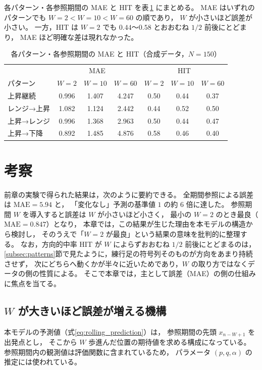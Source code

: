 \documentclass[a4j,dvipdfmx]{jsarticle}
\theoremstyle{plainnote}
\begin{document}
各パターン・各参照期間の MAE と HIT を表\,\ref{tab:pattern_summary} にまとめる。
MAE はいずれのパターンでも $W=2<W=10<W=60$ の順であり，
$W$ が小さいほど誤差が小さい。
一方，HIT は $W=2$ でも $0.44$〜$0.58$ とおおむね $1/2$ 前後にとどまり，
MAE ほど明確な差は現れなかった。

\begin{table}[H]\centering
  \caption{各パターン・各参照期間の MAE と HIT（合成データ，$N=150$）}
  \label{tab:pattern_summary}
  \begin{tabular}{l|ccc|ccc}\hline
    & \multicolumn{3}{c|}{MAE} & \multicolumn{3}{c}{HIT} \\
    パターン & $W=2$ & $W=10$ & $W=60$ & $W=2$ & $W=10$ & $W=60$ \\\hline
    上昇継続     & 0.996 & 1.407 & 4.247 & 0.50 & 0.44 & 0.37 \\
    レンジ→上昇 & 1.082 & 1.124 & 2.442 & 0.44 & 0.52 & 0.50 \\
    上昇→レンジ & 0.996 & 1.368 & 2.963 & 0.50 & 0.44 & 0.47 \\
    上昇→下降   & 0.892 & 1.485 & 4.876 & 0.58 & 0.46 & 0.40 \\\hline
  \end{tabular}
\end{table}

\newpage

\section{考察}
前章の実験で得られた結果は，次のように要約できる。
全期間参照による誤差は $\mathrm{MAE}=5.94$ と，
「変化なし」予測の基準値 $1$ の約 $6$ 倍に達した。
参照期間 $W$ を導入すると誤差は $W$ が小さいほど小さく，
最小の $W=2$ のとき最良（$\mathrm{MAE}=0.847$）となり，
本章では，この結果が生じた理由を本モデルの構造から検討し，
そのうえで「$W=2$ が最良」という結果の意味を批判的に整理する。
なお，方向的中率 HIT が $W$ によらずおおむね $1/2$ 前後にとどまるのは，
\ref{subsec:patterns}節で見たように，練行足の符号列そのものが方向をあまり持続させず，
次にどちらへ動くかが半々に近いためであり，$W$ の取り方ではなくデータの側の性質による。
そこで本章では，主として誤差（MAE）の側の仕組みに焦点を当てる。

\subsection{$W$ が大きいほど誤差が増える機構}\label{subsec:disc_mech}

本モデルの予測値（式\eqref{eq:rolling_prediction}）は，
参照期間の先頭 $x_{n-W+1}$ を出発点とし，
そこから $W$ 歩進んだ位置の期待値を求める構成になっている。
参照期間内の観測値は評価関数に含まれているため，
パラメータ $(p,q,\alpha)$ の推定には使われている。
\end{document}
